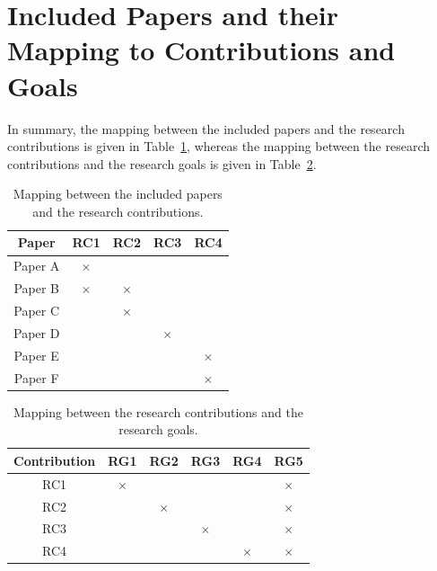 \section[Included Papers and their Mapping to Contributions and Goals]{\small Included Papers and their Mapping to Contributions and Goals}


In summary, the mapping between the included papers and the research contributions is given in Table~\ref{paper_contribution}, whereas the mapping between the research contributions and the research goals is given in Table~\ref{contribution_goals}.

\begin{table}[h!]
\centering
	\begin{tabular}{@{}ccccc@{}}
		\toprule
		Paper & RC1 & RC2& RC3 & RC4\\ \midrule
		Paper A & $\times$ &  &  &  \\
		Paper B & $\times$ & $\times$ &  &  \\
		Paper C &  & $\times$ &  &  \\
		Paper D &  &  & $\times$  &\\
		Paper E &  &  &  & $\times$ \\
		Paper F &  &  &  & $\times$\\ \bottomrule
	\end{tabular}
\caption{Mapping between the included papers and the research contributions.}\label{paper_contribution}
\end{table}

\begin{table}[h!]
\centering
		\begin{tabular}{@{}cccccc@{}}
		\toprule
		Contribution & RG1 & RG2& RG3 & RG4 & RG5\\ \midrule
		RC1 & $\times$ &  &  &  &$\times$\\
		RC2 &  & $\times$ &  & & $\times$\\
		RC3 &  &  & $\times$ & & $\times$\\
		RC4 &  &  &  & $\times$ &$\times$\\\bottomrule
	\end{tabular}
\caption{Mapping between the research contributions and the research goals.}\label{contribution_goals}
\end{table}
